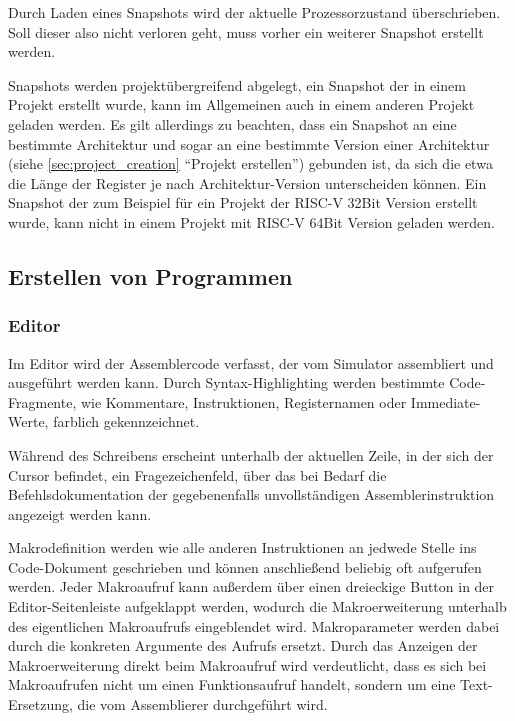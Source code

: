 \begin{warningblock}
Durch Laden eines Snapshots wird der aktuelle Prozessorzustand überschrieben.
Soll dieser also nicht verloren geht, muss vorher ein weiterer Snapshot erstellt
werden.
\end{warningblock}

Snapshots werden projektübergreifend abgelegt, ein Snapshot der in einem Projekt
erstellt wurde, kann im Allgemeinen auch in einem anderen Projekt geladen
werden. Es gilt allerdings zu beachten, dass ein Snapshot an eine bestimmte
Architektur und sogar an eine bestimmte Version einer Architektur (siehe
\ref{sec:project_creation} ``Projekt erstellen'') gebunden ist, da sich die etwa
die Länge der Register je nach Architektur-Version unterscheiden können. Ein
Snapshot der zum Beispiel für ein Projekt der RISC-V 32Bit Version erstellt
wurde, kann nicht in einem Projekt mit RISC-V 64Bit Version geladen werden.

\subsection{Erstellen von Programmen}

\subsubsection{Editor}
\label{sec:Editor}

Im Editor wird der Assemblercode verfasst, der vom Simulator assembliert und
ausgeführt werden kann. Durch Syntax-Highlighting werden bestimmte
Code-Fragmente, wie Kommentare, Instruktionen, Registernamen oder Immediate-Werte,
farblich gekennzeichnet.

Während des Schreibens erscheint unterhalb der aktuellen Zeile, in der sich der
Cursor befindet, ein Fragezeichenfeld, über das bei Bedarf die
Befehlsdokumentation der gegebenenfalls unvollständigen Assemblerinstruktion
angezeigt werden kann.

Makrodefinition werden wie alle anderen Instruktionen an jedwede Stelle ins
Code-Dokument geschrieben und können anschließend beliebig oft aufgerufen
werden. Jeder Makroaufruf kann außerdem über einen dreieckige Button in
der Editor-Seitenleiste aufgeklappt werden, wodurch die Makroerweiterung
unterhalb des eigentlichen Makroaufrufs eingeblendet wird. Makroparameter werden
dabei durch die konkreten Argumente des Aufrufs ersetzt. Durch das Anzeigen der
Makroerweiterung direkt beim Makroaufruf wird verdeutlicht, dass es sich bei
Makroaufrufen nicht um einen Funktionsaufruf handelt, sondern um eine
Text-Ersetzung, die vom Assemblierer durchgeführt wird.

